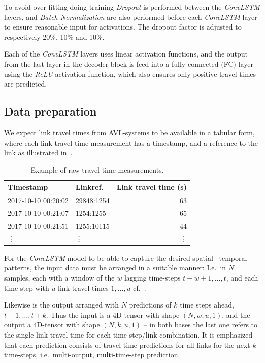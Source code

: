 \documentclass[preprint,11pt,5p,twocolumn]{elsarticle}
\begin{document}
To avoid over-fitting doing training \emph{Dropout} \cite{Dropout} is performed between the \emph{ConvLSTM} layers, and \emph{Batch Normalization} \cite{BatchNorm} are also performed before each \emph{ConvLSTM} layer to ensure reasonable input for activations. The dropout factor is adjusted to respectively 20\%, 10\% and 10\%.

Each of the \emph{ConvLSTM} layers uses linear activation functions, and the output from the last layer in the decoder-block is feed into a fully connected (FC) layer using the \emph{ReLU} activation function, which also ensures only positive travel times are predicted.

\subsection{Data preparation}
We expect link travel times from AVL-systems to be available in a tabular form, where each link travel time measurement has a timestamp, and a reference to the link as illustrated in~.
\begin{table}[!ht]
  \centering
  \footnotesize
  \begin{tabular}{llr}
    Timestamp & Linkref. & Link travel time (s) \\ \hline \hline
    2017-10-10 00:20:02 & 29848:1254 & 63 \\ \hline
    2017-10-10 00:21:07 & 1254:1255  & 65 \\ \hline
    2017-10-10 00:21:51 & 1255:10115 & 44 \\ \hline
    \vdots & \vdots & \vdots 
  \end{tabular}
  \caption{Example of raw travel time measurements.}
  \label{tab:data}
\end{table}

For the \emph{ConvLSTM} model to be able to capture the desired spatial-–temporal patterns, the input data must be arranged in a suitable manner: I.e.\ in $N$ samples, each with a window of the $w$ lagging time-steps $t-w+1, \ldots, t$, and each time-step with $u$ link travel times $1, \ldots, u$ cf.~.

Likewise is the output arranged with $N$ predictions of $k$ time steps ahead, $t+1, \ldots, t+k$. Thus the input is a 4D-tensor with shape $(N, w, u, 1)$, and the output a 4D-tensor with shape $(N, k, u, 1)$ -- in both bases the last one refers to the single link travel time for each time-step/link combination. It is emphasized that each prediction consists of travel time predictions for all links for the next $k$ time-steps, i.e.\ multi-output, multi-time-step prediction.
\end{document}
